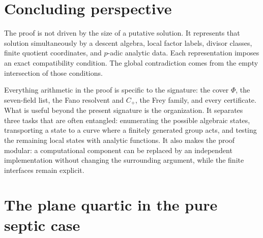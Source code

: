 \documentclass[11pt]{article}
\theoremstyle{definition}
\theoremstyle{remark}
\begin{document}
\section{Concluding perspective}

The proof is not driven by the size of a putative solution.  It represents
that solution simultaneously by a descent algebra, local factor labels,
divisor classes, finite quotient coordinates, and $p$-adic analytic data.
Each representation imposes an exact compatibility condition.  The global
contradiction comes from the empty intersection of those conditions.

Everything arithmetic in the proof is specific to the signature: the cover
$\Phi$, the seven-field list, the Fano resolvent and $C_+$, the Frey family,
and every certificate.  What is useful beyond the present signature is the
organization.  It separates three tasks that are often entangled: enumerating the possible algebraic
states, transporting a state to a curve where a finitely generated group
acts, and testing the remaining local states with analytic functions.  It
also makes the proof modular: a computational component can be replaced by an
independent implementation without changing the surrounding argument, while
the finite interfaces remain explicit.

\appendix

\section{The plane quartic in the pure septic case}\label{app:Cplus}
\end{document}
